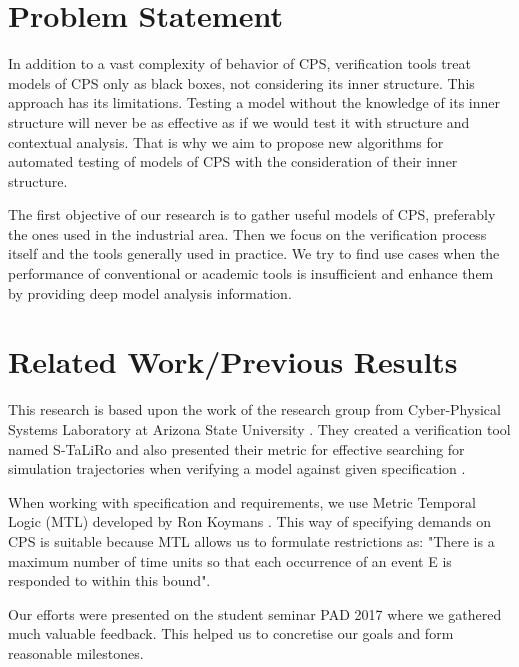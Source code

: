 \section{Problem Statement}
In addition to a vast complexity of behavior of CPS, verification tools treat models of CPS only as black boxes, not considering its inner structure. This approach has its limitations. Testing a model without the knowledge of its inner structure will never be as effective as if we would test it with structure and contextual analysis. That is why we aim to propose new algorithms for automated testing of models of CPS with the consideration of their inner structure.

The first objective of our research is to gather useful models of CPS, preferably the ones used in the industrial area. Then we focus on the verification process itself and the tools generally used in practice. We try to find use cases when the performance of conventional or academic tools is insufficient and enhance them by providing deep model analysis information.

\section{Related Work/Previous Results}
This research is based upon the work of the research group from Cyber-Physical Systems Laboratory at Arizona State University  \cite{Fainekos:sTaLiRo,Fainekos:robustness,Fainekos:testCaseGeneration,Fainekos:MiningProperties}. They created a verification tool named S-TaLiRo \cite{Fainekos:sTaLiRo} and also presented their metric for effective searching for simulation trajectories when verifying a model against given specification \cite{Fainekos:robustness}.

When working with specification and requirements, we use Metric Temporal Logic (MTL) developed by Ron Koymans \cite{Koymans:MTL}. This way of specifying demands on CPS is suitable because MTL allows us to formulate restrictions as: "There is a maximum number of time units so that each occurrence of an event E is responded to within this bound".

Our efforts were presented on the student seminar PAD 2017 \cite{TA:PAD} where we gathered much valuable feedback. This helped us to concretise our goals and form reasonable milestones.

